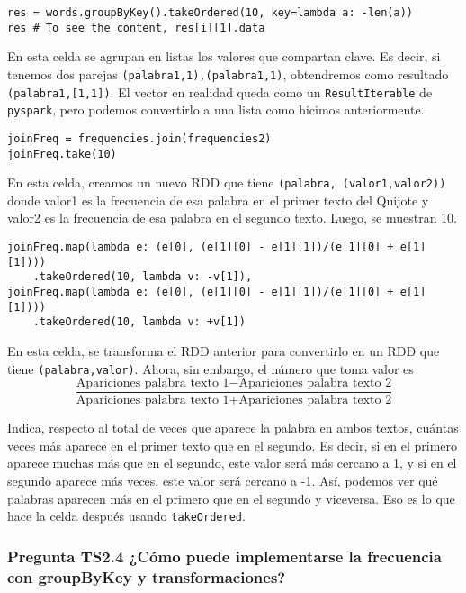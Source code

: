 \documentclass[11pt]{article}
\def\inline{\lstinline[basicstyle=\ttfamily,keywordstyle={}]}
\begin{document}
\begin{verbatim}
res = words.groupByKey().takeOrdered(10, key=lambda a: -len(a))
res # To see the content, res[i][1].data
\end{verbatim}

En esta celda se agrupan en listas los valores que compartan clave. Es decir, si tenemos dos parejas \inline{(palabra1,1),(palabra1,1)}, obtendremos como resultado \inline{(palabra1,[1,1])}. El vector en realidad queda como un \inline{ResultIterable} de \inline{pyspark}, pero podemos convertirlo a una lista como hicimos anteriormente.

\begin{verbatim}
joinFreq = frequencies.join(frequencies2)
joinFreq.take(10)
\end{verbatim}

En esta celda, creamos un nuevo RDD que tiene \inline{(palabra, (valor1,valor2))} donde valor1 es la frecuencia de esa palabra en el primer texto del Quijote y valor2 es la frecuencia de esa palabra en el segundo texto. Luego, se muestran 10.

\begin{verbatim}
joinFreq.map(lambda e: (e[0], (e[1][0] - e[1][1])/(e[1][0] + e[1][1])))
    .takeOrdered(10, lambda v: -v[1]),
joinFreq.map(lambda e: (e[0], (e[1][0] - e[1][1])/(e[1][0] + e[1][1])))
    .takeOrdered(10, lambda v: +v[1])
\end{verbatim}

En esta celda, se transforma el RDD anterior para convertirlo en un RDD que tiene \inline{(palabra,valor)}. Ahora, sin embargo, el número que toma valor es 
\[
\frac{\text{Apariciones palabra texto 1} - \text{Apariciones palabra texto 2}}{\text{Apariciones palabra texto 1} + \text{Apariciones palabra texto 2}}
\]

Indica, respecto al total de veces que aparece la palabra en ambos textos, cuántas veces más aparece en el primer texto que en el segundo. Es decir, si en el primero aparece muchas más que en el segundo, este valor será más cercano a 1, y si en el segundo aparece más veces, este valor será cercano a -1. Así, podemos ver qué palabras aparecen más en el primero que en el segundo y viceversa. Eso es lo que hace la celda después usando \inline{takeOrdered}.

\subsubsection*{Pregunta TS2.4 ¿Cómo puede implementarse la frecuencia con groupByKey y transformaciones? }
\end{document}
